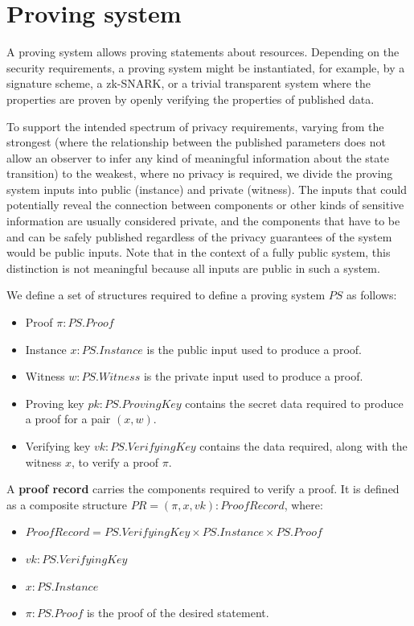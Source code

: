 \section{Proving system}

A proving system allows proving statements about resources. Depending on the security requirements, a proving system might be instantiated, for example, by a signature scheme, a zk-SNARK, or a trivial transparent system where the properties are proven by openly verifying the properties of published data.

\label{public-private-inputs}
To support the intended spectrum of privacy requirements, varying from the strongest (where the relationship between the published parameters does not allow an observer to infer any kind of meaningful information about the state transition) to the weakest, where no privacy is required, we divide the proving system inputs into public (instance) and private (witness). The inputs that could potentially reveal the connection between components or other kinds of sensitive information are usually considered private, and the components that have to be and can be safely published regardless of the privacy guarantees of the system would be public inputs. Note that in the context of a fully public system, this distinction is not meaningful because all inputs are public in such a system.

We define a set of structures required to define a proving system $PS$ as follows:
\begin{itemize}
    \item Proof $\pi: PS.Proof$
    \item Instance $x: PS.Instance$ is the public input used to produce a proof.
    \item Witness $w: PS.Witness$ is the private input used to produce a proof.
    \item Proving key $pk: PS.ProvingKey$ contains the secret data required to produce a proof for a pair $(x, w)$. 
    \item Verifying key $vk: PS.VerifyingKey$ contains the data required, along with the witness $x$, to verify a proof $\pi$.
\end{itemize}

A \textbf{proof record} carries the components required to verify a proof. It is defined as a composite structure $PR = (\pi, x, vk): ProofRecord$, where:
\begin{itemize}
    \item $ProofRecord = PS.VerifyingKey \times PS.Instance \times PS.Proof$
    \item $vk: PS.VerifyingKey$
    \item $x: PS.Instance$
    \item $\pi: PS.Proof$ is the proof of the desired statement.
\end{itemize}

